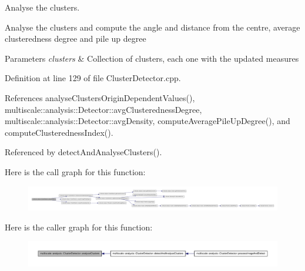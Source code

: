 \-Analyse the clusters. 

\-Analyse the clusters and compute the angle and distance from the centre, average clusteredness degree and pile up degree


\begin{DoxyParams}{\-Parameters}
{\em clusters} & \-Collection of clusters, each one with the updated measures \\
\hline
\end{DoxyParams}


\-Definition at line 129 of file \-Cluster\-Detector.\-cpp.



\-References analyse\-Clusters\-Origin\-Dependent\-Values(), multiscale\-::analysis\-::\-Detector\-::avg\-Clusteredness\-Degree, multiscale\-::analysis\-::\-Detector\-::avg\-Density, compute\-Average\-Pile\-Up\-Degree(), and compute\-Clusteredness\-Index().



\-Referenced by detect\-And\-Analyse\-Clusters().



\-Here is the call graph for this function\-:
\nopagebreak
\begin{figure}[H]
\begin{center}
\leavevmode
\includegraphics[width=350pt]{classmultiscale_1_1analysis_1_1ClusterDetector_af994e960ba3cd76cc67e714ea276264a_cgraph}
\end{center}
\end{figure}




\-Here is the caller graph for this function\-:
\nopagebreak
\begin{figure}[H]
\begin{center}
\leavevmode
\includegraphics[width=350pt]{classmultiscale_1_1analysis_1_1ClusterDetector_af994e960ba3cd76cc67e714ea276264a_icgraph}
\end{center}
\end{figure}


